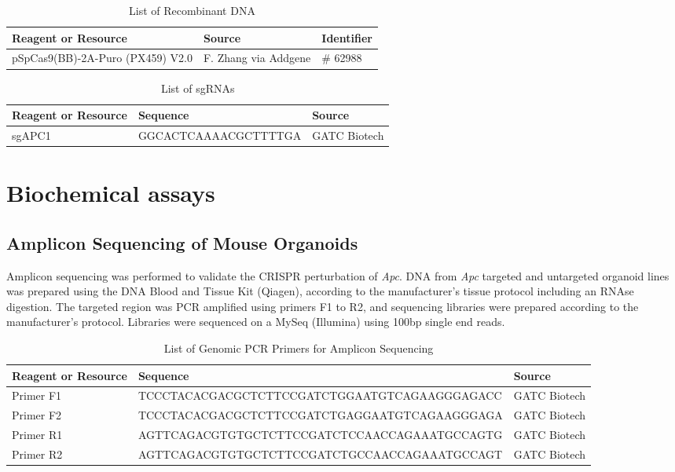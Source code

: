 \begin{flushleft}
\begin{table}[htb]
\caption{List of Recombinant DNA}
\label{tab:recombinant_dna} %
\begin{tabularx}{\textwidth}{Xll}
\toprule
\textbf{Reagent or Resource} & \textbf{Source} & \textbf{Identifier} \\
\midrule
pSpCas9(BB)-2A-Puro (PX459) V2.0 & F. Zhang via Addgene & \# 62988 \\
\bottomrule
\end{tabularx}
\end{table}

\begin{table}[htb]
\caption{List of sgRNAs}
\label{tab:sgrna} %
\begin{tabularx}{\textwidth}{XlX}
\toprule
\textbf{Reagent or Resource} & \textbf{Sequence} & \textbf{Source} \\
\midrule
sgAPC1 & GGCACTCAAAACGCTTTTGA & GATC Biotech \\
\bottomrule
\end{tabularx}
\end{table}

\section{Biochemical assays}

\subsection{Amplicon Sequencing of Mouse Organoids}
Amplicon sequencing was performed to validate the CRISPR perturbation of \textit{Apc}. DNA from \textit{Apc} targeted and untargeted organoid lines was prepared using the DNA Blood and Tissue Kit (Qiagen), according to the manufacturer’s tissue protocol including an RNAse digestion. The targeted region was PCR amplified using primers F1 to R2, and sequencing libraries were prepared according to the manufacturer’s protocol. Libraries were sequenced on a MySeq (Illumina) using 100bp single end reads. 

\begin{table}[htb]
\caption{List of Genomic PCR Primers for Amplicon Sequencing}
\label{tab:oligonucleotides} %
\begin{tabularx}{\textwidth}{XlX}
\toprule
\textbf{Reagent or Resource} & \textbf{Sequence} & \textbf{Source} \\
\midrule
Primer F1 & TCCCTACACGACGCTCTTCCGATCTGGAATGTCAGAAGGGAGACC & GATC Biotech \\
Primer F2 & TCCCTACACGACGCTCTTCCGATCTGAGGAATGTCAGAAGGGAGA & GATC Biotech \\
Primer R1 & AGTTCAGACGTGTGCTCTTCCGATCTCCAACCAGAAATGCCAGTG & GATC Biotech \\
Primer R2 & AGTTCAGACGTGTGCTCTTCCGATCTGCCAACCAGAAATGCCAGT & GATC Biotech \\
\bottomrule
\end{tabularx}
\end{table}


\end{flushleft}
